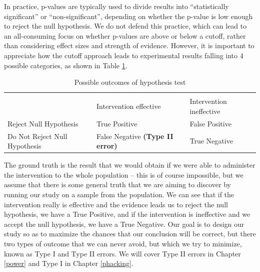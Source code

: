 \documentclass{krantz}
\begin{document}
In practice, p-values are typically used to divide results into ``statistically significant'' or ``non-significant'', depending on whether the p-value is low enough to reject the null hypothesis. We do not defend this practice, which can lead to an all-consuming focus on whether p-values are above or below a cutoff, rather than considering effect sizes and strength of evidence. However, it is important to appreciate how the cutoff approach leads to experimental results falling into 4 possible categories, as shown in Table \ref{tab:confusionMat}.

\begin{table}

\caption{\label{tab:confusionMat}Possible outcomes of hypothesis test}
\centering
\begin{tabular}[t]{>{\centering\arraybackslash}p{9em}>{\centering\arraybackslash}p{9em}>{\centering\arraybackslash}p{9em}}
\toprule
\multicolumn{1}{c}{ } & \multicolumn{2}{c}{Ground truth} \\
\cmidrule(l{3pt}r{3pt}){2-3}
 & Intervention effective & Intervention ineffective\\
\midrule
Reject Null Hypothesis & True Positive & False Positive 
\textbf{\cellcolor{gray!6}{ (Type I error)}}\\
\addlinespace
Do Not Reject Null Hypothesis & False Negative 
\textbf{ (Type II error)} & True Negative\\
\bottomrule
\end{tabular}
\end{table}

The ground truth is the result that we would obtain if we were able to administer the intervention to the whole population -- this is of course impossible, but we assume that there is some general truth that we are aiming to discover by running our study on a sample from the population. We can see that if the intervention really is effective and the evidence leads us to reject the null hypothesis, we have a True Positive, and if the intervention is ineffective and we accept the null hypothesis, we have a True Negative. Our goal is to design our study so as to maximize the chances that our conclusion will be correct, but there two types of outcome that we can never avoid, but which we try to minimize, known as Type I and Type II errors. We will cover Type II errors in Chapter \ref{power} and Type I in Chapter \ref{phacking}.
\end{document}
